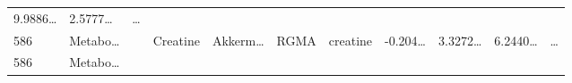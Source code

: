 \documentclass[
]{article}
\begin{document}
\begin{longtable}[]{@{}lllllllllll@{}}
\begin{minipage}[t]{0.07\columnwidth}
9.9886\ldots{}\strut
\end{minipage} & \begin{minipage}[t]{0.07\columnwidth}\raggedright
2.5777\ldots{}\strut
\end{minipage} & \begin{minipage}[t]{0.03\columnwidth}\raggedright
\ldots{}\strut
\end{minipage}\tabularnewline
\begin{minipage}[t]{0.03\columnwidth}\raggedright
586\strut
\end{minipage} & \begin{minipage}[t]{0.07\columnwidth}\raggedright
Metabo\ldots{}\strut
\end{minipage} & \begin{minipage}[t]{0.07\columnwidth}\raggedright
\strut
\end{minipage} & \begin{minipage}[t]{0.09\columnwidth}\raggedright
Creatine\strut
\end{minipage} & \begin{minipage}[t]{0.07\columnwidth}\raggedright
Akkerm\ldots{}\strut
\end{minipage} & \begin{minipage}[t]{0.07\columnwidth}\raggedright
RGMA\strut
\end{minipage} & \begin{minipage}[t]{0.09\columnwidth}\raggedright
creatine\strut
\end{minipage} & \begin{minipage}[t]{0.07\columnwidth}\raggedright
-0.204\ldots{}\strut
\end{minipage} & \begin{minipage}[t]{0.07\columnwidth}\raggedright
3.3272\ldots{}\strut
\end{minipage} & \begin{minipage}[t]{0.07\columnwidth}\raggedright
6.2440\ldots{}\strut
\end{minipage} & \begin{minipage}[t]{0.03\columnwidth}\raggedright
\ldots{}\strut
\end{minipage}\tabularnewline
\begin{minipage}[t]{0.03\columnwidth}\raggedright
586\strut
\end{minipage} & \begin{minipage}[t]{0.07\columnwidth}\raggedright
Metabo\ldots{}\strut
\end{minipage} & \begin{minipage}[t]{0.07\columnwidth}\raggedright

\end{minipage}
\end{longtable}
\end{document}
